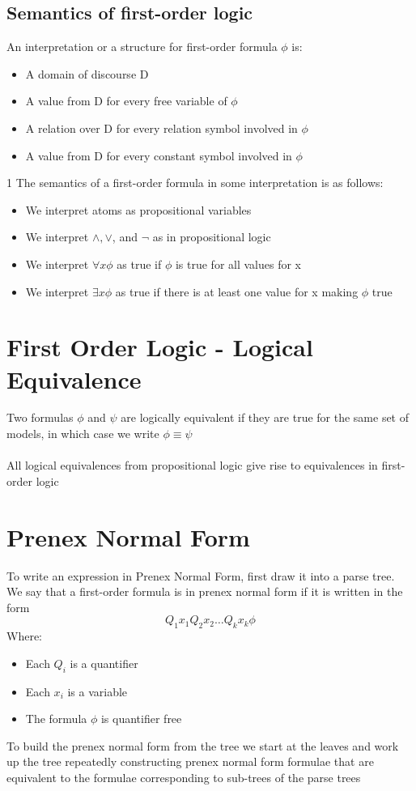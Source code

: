 \documentclass{article}[18pt]
\begin{document}
\subsection{Semantics of first-order logic}
An interpretation or a structure for first-order formula $\phi$ is:
\begin{itemize}
	\item A domain of discourse D
	\item A value from D for every free variable of $\phi$
	\item A relation over D for every relation symbol involved in $\phi$
	\item A value from D for every constant symbol involved in $\phi$
\end{itemize}1
The semantics of a first-order formula in some interpretation is as follows:
\begin{itemize}
	\item We interpret atoms as propositional variables
	\item We interpret $\land,\lor$, and $\lnot$ as in propositional logic
	\item We interpret $\forall x \phi$ as true if $\phi$ is true for all values for x
	\item We interpret $\exists x \phi$ as true if there is at least one value for x making $\phi$ true
\end{itemize}
\section{First Order Logic - Logical Equivalence}
Two formulas $\phi$ and $\psi$ are logically equivalent if they are true for the same set of models, in which case we write $\phi\equiv \psi$\\
\\
All logical equivalences from propositional logic give rise to equivalences in first-order logic
\section{Prenex Normal Form}
To write an expression in Prenex Normal Form, first draw it into a parse tree.\\
We say that a first-order formula is in prenex normal form if it is written in the form
\[
Q_{1} x_{1} Q_{2} x_{2} \ldots Q_{k} x_{k} \phi
\]
Where:
\begin{itemize}
	\item Each $Q_i$ is a quantifier
	\item Each $x_i$ is a variable
	\item The formula $\phi$ is quantifier free
\end{itemize}
To build the prenex normal form from the tree we start at the leaves and work up the tree repeatedly constructing prenex normal form formulae that are equivalent to the formulae corresponding to sub-trees of the parse trees
\end{document}
